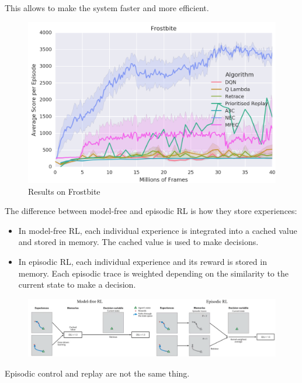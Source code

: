 \begin{description}
\begin{casestudy}
            This allows to make the system faster and more efficient.
            \begin{figure}[H]
                \centering
                \includegraphics[width=0.5\linewidth]{./img/nec3.png}
                \caption{Results on Frostbite}
            \end{figure}
        \end{casestudy}

        \begin{remark}
            The difference between model-free and episodic RL is how they store experiences:
            \begin{itemize}
                \item In model-free RL, each individual experience is integrated into a cached value and stored in memory. The cached value is used to make decisions.
                \item In episodic RL, each individual experience and its reward is stored in memory. Each episodic trace is weighted depending on the similarity to the current state to make a decision.
            \end{itemize}

            \begin{figure}[H]
                \centering
                \includegraphics[width=0.9\linewidth]{./img/model_free_vs_episodic.png}
            \end{figure}
        \end{remark}

        \begin{remark}
            Episodic control and replay are not the same thing.
        \end{remark}


\end{description}
